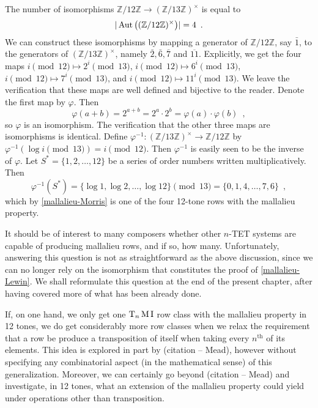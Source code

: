 \begin{example}
	The number of isomorphisms
	$\mathbb{Z} / 12 \mathbb{Z} \to (\mathbb{Z} / 13 \mathbb{Z})^\times$ is equal to
	\begin{equation}
		|\operatorname{Aut}\big((\mathbb{Z} / 12 \mathbb{Z})^\times\big)| = 4 \enspace.
	\end{equation}
	We can construct these isomorphisms by mapping a generator of
	$\mathbb{Z} / 12 \mathbb{Z}$, say $\bar{1}$, to the generators of
	$(\mathbb{Z} / 13 \mathbb{Z})^\times$, namely $\bar{2}, \bar{6}, \bar{7}$ and
	$\overline{11}$. Explicitly, we get the four maps $i \pmod{12} \mapsto 2^i \pmod{13}$,
	$i \pmod{12} \mapsto 6^i \pmod{13}$, $i \pmod{12} \mapsto 7^i \pmod{13}$, and
	$i \pmod{12} \mapsto 11^i \pmod{13}$. We leave the verification that these maps are
	well defined and bijective to the reader. Denote the first map by $\varphi$. Then
	\begin{equation}
		\varphi(a + b) = 2^{a + b} = 2^a \cdot 2^b = \varphi(a) \cdot \varphi(b) \enspace,
	\end{equation}
	so $\varphi$ is an isomorphism. The verification that the other three maps are
	isomorphisms is identical. Define
	$\varphi^{-1} : (\mathbb{Z} / 13 \mathbb{Z})^\times \to \mathbb{Z} / 12 \mathbb{Z}$ by
	$\varphi^{-1}(\log i \pmod{13}) = i \pmod{12}$. Then $\varphi^{-1}$ is easily seen to
	be the inverse of $\varphi$. Let $S^* = \{ 1, 2, \dots, 12 \}$ be a series of order
	numbers written multiplicatively. Then
	\begin{equation}
		\varphi^{-1}(S^*) = \{ \log 1, \log 2, \dots, \log 12 \} \pmod{13} =
		\{ 0, 1, 4, \dots, 7, 6 \} \enspace,
	\end{equation}
	which by \ref{mallalieu-Morris} is one of the four 12-tone rows with the mallalieu
	property.
\end{example}

It should be of interest to many composers whether other $n$-TET systems are capable
of producing mallalieu rows, and if so, how many. Unfortunately, answering this question
is not as straightforward as the above discussion, since we can no longer rely on
the isomorphism that constitutes the proof of \ref{mallalieu-Lewin}. We shall reformulate
this question at the end of the present chapter, after having covered more of what has
been already done.

If, on one hand, we only get one $\operatorname{T}_n\operatorname{M}\operatorname{I}$ row class with the mallalieu property in
12 tones, we do get considerably more row classes when we relax the requirement that a row
be produce a transposition of itself when taking every $n^\text{th}$ of its elements.
This idea is explored in part by (citation -- Mead), however without specifying
any combinatorial aspect (in the mathematical sense) of this generalization. Moreover,
we can certainly go beyond (citation -- Mead) and investigate, in 12 tones, what an
extension of the mallalieu property could yield under operations other than transposition.
